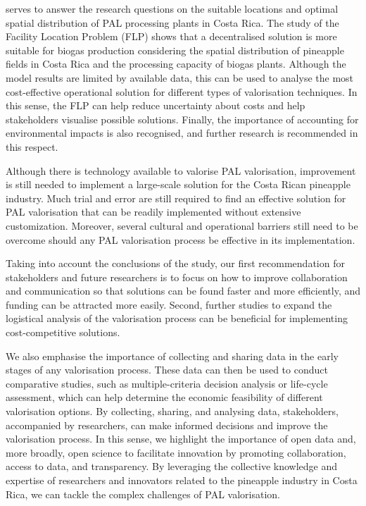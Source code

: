 serves to answer the research questions on the suitable locations and optimal spatial distribution of PAL processing plants in Costa Rica. The study of the Facility Location Problem (FLP) shows that a decentralised solution is more suitable for biogas production considering the spatial distribution of pineapple fields in Costa Rica and the processing capacity of biogas plants. Although the model results are limited by available data, this can be used to analyse the most cost-effective operational solution for different types of valorisation techniques. In this sense, the FLP can help reduce uncertainty about costs and help stakeholders visualise possible solutions. Finally, the importance of accounting for environmental impacts is also recognised, and further research is recommended in this respect. 

Although there is technology available to valorise PAL valorisation, improvement is still needed to implement a large-scale solution for the Costa Rican pineapple industry. Much trial and error are still required to find an effective solution for PAL valorisation that can be readily implemented without extensive customization. Moreover, several cultural and operational barriers still need to be overcome should any PAL valorisation process be effective in its implementation. 

Taking into account the conclusions of the study, our first recommendation for stakeholders and future researchers is to focus on how to improve collaboration and communication so that solutions can be found faster and more efficiently, and funding can be attracted more easily. Second, further studies to expand the logistical analysis of the valorisation process can be beneficial for implementing cost-competitive solutions.

We also emphasise the importance of collecting and sharing data in the early stages of any valorisation process. These data can then be used to conduct comparative studies, such as multiple-criteria decision analysis or life-cycle assessment, which can help determine the economic feasibility of different valorisation options. By collecting, sharing, and analysing data, stakeholders, accompanied by researchers, can make informed decisions and improve the valorisation process. In this sense, we highlight the importance of open data and, more broadly, open science to facilitate innovation by promoting collaboration, access to data, and transparency. By leveraging the collective knowledge and expertise of researchers and innovators related to the pineapple industry in Costa Rica, we can tackle the complex challenges of PAL valorisation.

